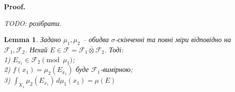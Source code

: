 \documentclass[a4paper, 10pt]{article}
\makeatletter
\theoremstyle{theoremdd}
\newtheorem{lemma}[theorem]{Lemma}
\renewenvironment{proof}[1][Proof.\\]{\par
\pushQED{\hfill \qed}%
\normalfont \topsep6\p@\@plus6\p@\relax
\trivlist
\item\relax
{\bfseries
#1\@addpunct{.}}\hspace\labelsep\ignorespaces
}{%
\popQED\endtrivlist\@endpefalse
}
\makeatother
\begin{document}
\begin{proof}
\iffalse
Нехай $E \in \mathcal{P}_{m+n}$, тобто $E = \displaystyle\prod_{k=1}^{m+n} (a_k,b_k] = \left( \prod_{k=1}^m (a_k,b_k \right) \times \left( \prod_{k=m+1}^{m+n} (a_k,b_k \right) = E_1 \times E_2$, де $E_1 \in \mathcal{P}_m$ та $E_2 \in \mathcal{P}_n$. Тоді звідси\\
$\lambda_{m+n}(E) \overset{\text{def. міра Лебега}}{=} \displaystyle\prod_{k=1}^{m+n} (b_k-a_k) = \prod_{k=1}^{m} (b_k-a_k) \prod_{k=m+1}^{m+n} (b_k-a_k) = \lambda_m(E_1) \lambda_n(E_2) \overset{\text{def. добутка мір}}{=} (\lambda_m \times \lambda_n)(E)$.\\
Отже, $\lambda_m \times \lambda_n = \lambda_{m+n}$ лише на півкільці $\mathcal{P}_{m+n}$.\\
Для $E \subset X_1 \times X_2$, для продовження міри $\lambda_m \times \lambda_n$ маємо:\\
$(\lambda_m \times \lambda_n)^*(E) = \displaystyle\inf_{\substack{E \subset \bigcup_{k=1}^\infty (E_1^{(k)} \times E_2^{(k)}) \\ E_1^{(k)} \in \mathcal{S}_m, E_2^{(k)} \in \mathcal{S}_n}} \sum_{k=1}^\infty \lambda_m\left(E_1^{(k)}\right) \lambda_n\left(E_2^{(k)}\right)$.\\
Але оскільки $E_1^{(k)} \in \mathcal{S}_m$, то тоді $\lambda_m\left( E_1^{(k)} \right)$ також є наближенням сумами вигляду $\displaystyle\sum_{i=1}^\infty \lambda_m\left(  A_1^{(i)} \right)$, де $A_1^{(i)} \in \mathcal{P}_m,\ E_1^{(k)} \subset \displaystyle\bigcup_{i=1}^\infty A_1^{(i)}$, наближення інфімумом робиться.\\
Аналогічно виконується при $E_2^{(k)} \in \mathcal{S}_n$. Тому звідси\\
$(\lambda_m \times \lambda_n)^*(E) = \displaystyle\inf_{ \substack{E \subset \bigcup_{n=i}^\infty (A_1^{(1)} \times A_2^{(i)} \\ A_1^{(i)} \in \mathcal{P}_m, A_2^{(i)} \in \mathcal{P}_n}} \sum_{i=1}^\infty \lambda_m\left( A_1^{(i)} \right) \lambda_n\left( A_2^{(i)} \right)$
\fi
\textit{TODO: розібрати.}
\end{proof}

\begin{lemma}
Задано $\mu_1,\mu_2$ -- обидва $\sigma$-скінченні та повні міри відповідно на $\mathcal{F}_1,\mathcal{F}_2$. Нехай $E \in \mathcal{F} = \mathcal{F}_1 \bar{\otimes} \mathcal{F}_2$. Тоді:\\
1) $E_{x_1} \in \mathcal{F}_2 \pmod {\mu_1}$;\\
2) $f(x_1) = \mu_2(E_{x_1})$ буде $\mathcal{F}_1$-вимірною;\\
3) $\displaystyle\int_{X_1} \mu_2(E_{x_1})\,d\mu_1(x_1) = \mu(E)$
\end{lemma}
\end{document}
